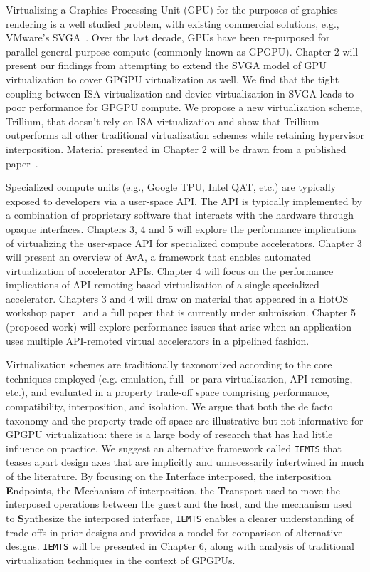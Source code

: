 Virtualizing a Graphics Processing Unit (GPU) for the purposes of graphics
rendering is a well studied problem, with existing commercial solutions, e.g.,
VMware’s SVGA~\cite{dowty2009gpu}. Over the last decade, GPUs have been
re-purposed for parallel general purpose compute (commonly known as GPGPU).
Chapter 2 will present our findings from attempting to extend the SVGA model
of GPU virtualization to cover GPGPU virtualization as well. We find that the
tight coupling between ISA virtualization and device virtualization in SVGA
leads to poor performance for GPGPU compute. We propose a new virtualization
scheme, Trillium, that doesn’t rely on ISA virtualization and show that
Trillium outperforms all other traditional virtualization schemes while
retaining hypervisor interposition. Material presented in Chapter 2 will be
drawn from a published paper~\cite{trillium}.

Specialized compute units (e.g., Google TPU, Intel QAT, etc.) are
typically exposed to developers via a user-space API. The API is typically
implemented by a combination of proprietary software that interacts with the
hardware through opaque interfaces.
Chapters 3, 4 and 5 will explore the performance implications of
virtualizing the user-space API for specialized compute accelerators.
Chapter 3 will present an overview of AvA, a framework that enables automated
virtualization of accelerator APIs. Chapter 4 will focus on the performance
implications of API-remoting based virtualization of a single specialized
accelerator. Chapters 3 and 4 will draw on material that appeared in a HotOS
workshop paper~\cite{ava-hotos} and a full paper that is currently under
submission. Chapter 5 (proposed work) will explore performance issues that
arise when an application uses multiple API-remoted virtual accelerators in a
pipelined fashion.

Virtualization schemes are traditionally taxonomized according to the core
techniques employed (e.g. emulation, full- or para-virtualization, API
remoting, etc.), and evaluated in a property trade-off space comprising
performance, compatibility, interposition, and isolation. We argue that both
the de facto taxonomy and the property trade-off space are illustrative but
not informative for GPGPU virtualization: there is a large body of research
that has had little influence on practice. We suggest an alternative framework
called \texttt{IEMTS} that teases apart design axes that are implicitly and
unnecessarily intertwined in much of the literature. By focusing on the
\textbf{I}nterface interposed, the interposition \textbf{E}ndpoints, the
\textbf{M}echanism of interposition, the \textbf{T}ransport used to move the
interposed operations between the guest and the host, and the mechanism used
to \textbf{S}ynthesize the interposed interface, \texttt{IEMTS} enables a
clearer understanding of trade-offs in prior designs and provides a model for
comparison of alternative designs. \texttt{IEMTS} will be presented in Chapter
6, along with analysis of traditional virtualization techniques in the context
of GPGPUs.

